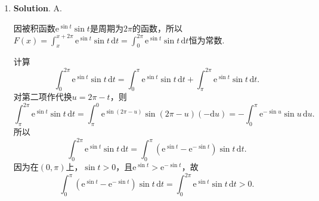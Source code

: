 \documentclass[../main.tex]{subfiles}
\begin{document}
\begin{enumerate}
          综上，曲线$y=x\ln\left(\mathrm{e}+\frac{1}{x}\right)$的渐近线条数为1.

    \item \textbf{Solution}. A.

          因被积函数$\mathrm{e}^{\sin t}\sin t$是周期为$2\pi$的函数，所以$F(x)=\int^{x+2\pi}
              _{x}\mathrm{e}^{\sin t}\sin t\,\mathrm{d}t=\int_{0}^{2\pi}\mathrm{e}^{\sin t}
              \sin t\,\mathrm{d}t$恒为常数.

          计算
          \[
              \int_{0}^{2\pi}\mathrm{e}^{\sin t}\sin t\,\mathrm{d}t =\int_{0}^{\pi}\mathrm{e}
              ^{\sin t}\sin t\,\mathrm{d}t+\int_{\pi}^{2\pi}\mathrm{e}^{\sin t}\sin t\,\mathrm{d}
              t.
          \]
          对第二项作代换$u=2\pi-t$，则
          \[
              \int_{\pi}^{2\pi}\mathrm{e}^{\sin t}\sin t\,\mathrm{d}
              t=\int_{\pi}^{0}\mathrm{e}^{\sin(2\pi-u)}\sin(2\pi-u)(-\mathrm{d}u)=-\int_{0}
              ^{\pi}\mathrm{e}^{-\sin u}\sin u\,\mathrm{d}u.
          \]
          所以
          \[
              \int_{0}^{2\pi}\mathrm{e}^{\sin t}\sin t\,\mathrm{d}t = \int_{0}^{\pi}\left
              (\mathrm{e}^{\sin t}-\mathrm{e}^{-\sin t}\right)\sin t\,\mathrm{d}t.
          \]
          因为在$(0,\pi)$上，$\sin t>0$，且$\mathrm{e}^{\sin t}>\mathrm{e}^{-\sin t}$，故
          \[
              \int_{0}^{\pi}\left(\mathrm{e}^{\sin t}-\mathrm{e}^{-\sin t}\right)\sin t\,\mathrm{d}
              t=\int_{0}^{2\pi}\mathrm{e}^{\sin t}\sin t\,\mathrm{d}t>0.
          \]
\end{enumerate}
\end{document}
